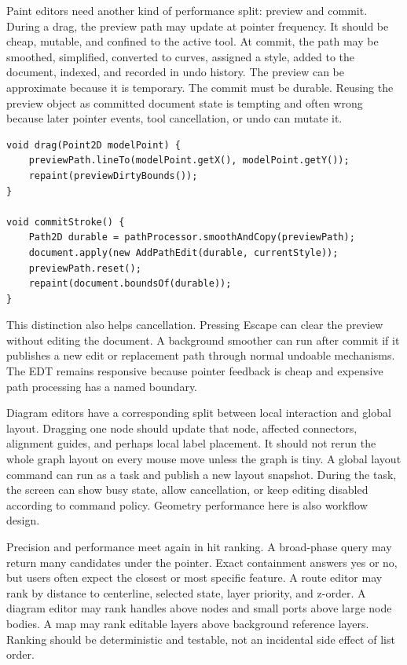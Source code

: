 Paint editors need another kind of performance split: preview and commit. During a drag, the preview path may update at pointer frequency. It should be cheap, mutable, and confined to the active tool. At commit, the path may be smoothed, simplified, converted to curves, assigned a style, added to the document, indexed, and recorded in undo history. The preview can be approximate because it is temporary. The commit must be durable. Reusing the preview object as committed document state is tempting and often wrong because later pointer events, tool cancellation, or undo can mutate it.

\begin{lstlisting}[caption={Separate preview geometry from committed document geometry.}]
void drag(Point2D modelPoint) {
    previewPath.lineTo(modelPoint.getX(), modelPoint.getY());
    repaint(previewDirtyBounds());
}

void commitStroke() {
    Path2D durable = pathProcessor.smoothAndCopy(previewPath);
    document.apply(new AddPathEdit(durable, currentStyle));
    previewPath.reset();
    repaint(document.boundsOf(durable));
}
\end{lstlisting}

This distinction also helps cancellation. Pressing Escape can clear the preview without editing the document. A background smoother can run after commit if it publishes a new edit or replacement path through normal undoable mechanisms. The EDT remains responsive because pointer feedback is cheap and expensive path processing has a named boundary.

Diagram editors have a corresponding split between local interaction and global layout. Dragging one node should update that node, affected connectors, alignment guides, and perhaps local label placement. It should not rerun the whole graph layout on every mouse move unless the graph is tiny. A global layout command can run as a task and publish a new layout snapshot. During the task, the screen can show busy state, allow cancellation, or keep editing disabled according to command policy. Geometry performance here is also workflow design.

Precision and performance meet again in hit ranking. A broad-phase query may return many candidates under the pointer. Exact containment answers yes or no, but users often expect the closest or most specific feature. A route editor may rank by distance to centerline, selected state, layer priority, and z-order. A diagram editor may rank handles above nodes and small ports above large node bodies. A map may rank editable layers above background reference layers. Ranking should be deterministic and testable, not an incidental side effect of list order.

